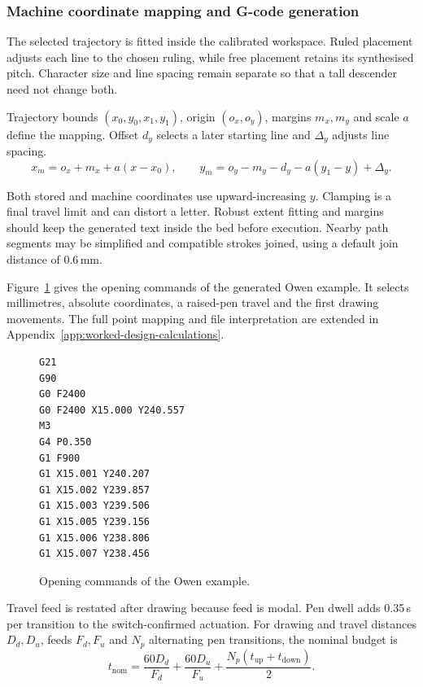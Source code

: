 \subsubsection{Machine coordinate mapping and G-code generation}
\label{sec:des-gcode}
The selected trajectory is fitted inside the calibrated workspace. Ruled placement adjusts each line to the chosen ruling, while free placement retains its synthesised pitch. Character size and line spacing remain separate so that a tall descender need not change both.

Trajectory bounds $(x_0,y_0,x_1,y_1)$, origin $(o_x,o_y)$, margins $m_x,m_y$ and scale $a$ define the mapping. Offset $d_y$ selects a later starting line and $\Delta_y$ adjusts line spacing.
\begin{equation}
x_m=o_x+m_x+a(x-x_0),\qquad
y_m=o_y-m_y-d_y-a(y_1-y)+\Delta_y.
\label{eq:des-machinecoords}
\end{equation}

Both stored and machine coordinates use upward-increasing $y$. Clamping is a final travel limit and can distort a letter. Robust extent fitting and margins should keep the generated text inside the bed before execution. Nearby path segments may be simplified and compatible strokes joined, using a default join distance of 0.6\,mm.

Figure~\ref{fig:des-gcode-excerpt} gives the opening commands of the generated Owen example. It selects millimetres, absolute coordinates, a raised-pen travel and the first drawing movements. The full point mapping and file interpretation are extended in Appendix~\ref{app:worked-design-calculations}.
\begin{figure}[H]
\begin{lstlisting}[style=designcode]
G21
G90
G0 F2400
G0 F2400 X15.000 Y240.557
M3
G4 P0.350
G1 F900
G1 X15.001 Y240.207
G1 X15.002 Y239.857
G1 X15.003 Y239.506
G1 X15.005 Y239.156
G1 X15.006 Y238.806
G1 X15.007 Y238.456
\end{lstlisting}
\caption{Opening commands of the Owen example.}
\label{fig:des-gcode-excerpt}
\end{figure}

Travel feed is restated after drawing because feed is modal. Pen dwell adds 0.35\,s per transition to the switch-confirmed actuation. For drawing and travel distances $D_d,D_u$, feeds $F_d,F_u$ and $N_p$ alternating pen transitions, the nominal budget is
\begin{equation}
t_{\mathrm{nom}}=\frac{60D_d}{F_d}+\frac{60D_u}{F_u}
+\frac{N_p(t_{\mathrm{up}}+t_{\mathrm{down}})}{2}.
\label{eq:des-timebudget}
\end{equation}

